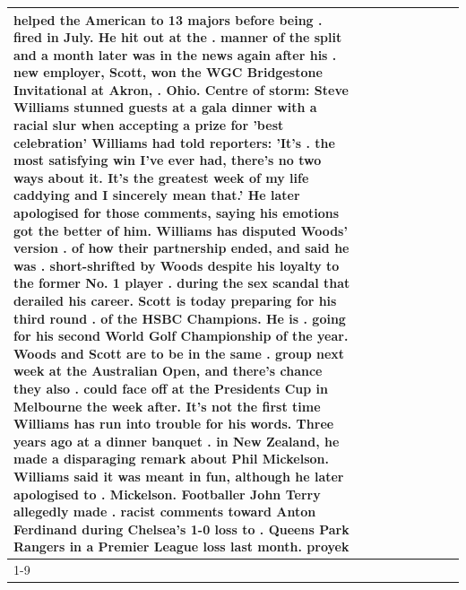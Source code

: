 \begin{table}[H]
\begin{tabular}{lllrlllll}
helped the American to 13 majors before being . fired in July. He hit out at the . manner of the split and a month later was in the news again after his . new employer, Scott, won the WGC Bridgestone Invitational at Akron, . Ohio. Centre of storm: Steve Williams stunned guests at a gala dinner with a racial slur when accepting a prize for 'best celebration' Williams had told reporters: 'It's . the most satisfying win I've ever had, there's no two ways about it. It's the greatest week of my life caddying and I sincerely mean that.' He later apologised for those comments, saying his emotions got the better of him. Williams has disputed Woods' version . of how their partnership ended, and said he was . short-shrifted by Woods despite his loyalty to the former No. 1 player . during the sex scandal that derailed his career. Scott is today preparing for his third round . of the HSBC Champions. He is . going for his second World Golf Championship of the year. Woods and Scott are to be in the same . group next week at the Australian Open, and there's chance they also . could face off at the Presidents Cup in Melbourne the week after. It's not the first time Williams has run into trouble for his words. Three years ago at a dinner banquet . in New Zealand, he made a disparaging remark about Phil Mickelson. Williams said it was meant in fun, although he later apologised to . Mickelson. Footballer John Terry allegedly made . racist comments toward Anton Ferdinand during Chelsea's 1-0 loss to . Queens Park Rangers in a Premier League loss last month. proyek \\
\cline{1-9}

\end{tabular}
\end{table}
